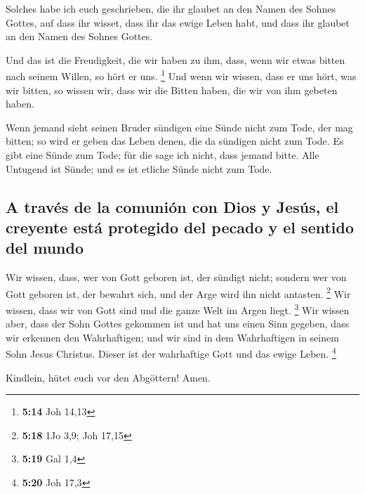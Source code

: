  Solches habe ich euch geschrieben, die ihr glaubet an
den Namen des Sohnes Gottes, auf dass ihr wisset, dass ihr das ewige
Leben habt, und dass ihr glaubet an den Namen des Sohnes Gottes.

 Und das ist die Freudigkeit, die wir haben zu ihm, dass,
wenn wir etwas bitten nach seinem Willen, so hört er uns. \footnote{\textbf{5:14}
  Joh 14,13}  Und wenn wir wissen, dass er uns hört, was
wir bitten, so wissen wir, dass wir die Bitten haben, die wir von ihm
gebeten haben.

 Wenn jemand sieht seinen Bruder sündigen eine Sünde
nicht zum Tode, der mag bitten; so wird er geben das Leben denen, die da
sündigen nicht zum Tode. Es gibt eine Sünde zum Tode; für die sage ich
nicht, dass jemand bitte.  Alle Untugend ist Sünde; und
es ist etliche Sünde nicht zum Tode.

\hypertarget{a-travuxe9s-de-la-comuniuxf3n-con-dios-y-jesuxfas-el-creyente-estuxe1-protegido-del-pecado-y-el-sentido-del-mundo}{%
\subsection{A través de la comunión con Dios y Jesús, el creyente está
protegido del pecado y el sentido del
mundo}\label{a-travuxe9s-de-la-comuniuxf3n-con-dios-y-jesuxfas-el-creyente-estuxe1-protegido-del-pecado-y-el-sentido-del-mundo}}

 Wir wissen, dass, wer von Gott geboren ist, der sündigt
nicht; sondern wer von Gott geboren ist, der bewahrt sich, und der Arge
wird ihn nicht antasten. \footnote{\textbf{5:18} 1Jo 3,9; Joh 17,15}
 Wir wissen, dass wir von Gott sind und die ganze Welt im
Argen liegt. \footnote{\textbf{5:19} Gal 1,4}  Wir wissen
aber, dass der Sohn Gottes gekommen ist und hat uns einen Sinn gegeben,
dass wir erkennen den Wahrhaftigen; und wir sind in dem Wahrhaftigen in
seinem Sohn Jesus Christus. Dieser ist der wahrhaftige Gott und das
ewige Leben. \footnote{\textbf{5:20} Joh 17,3}

 Kindlein, hütet euch vor den Abgöttern! Amen.
